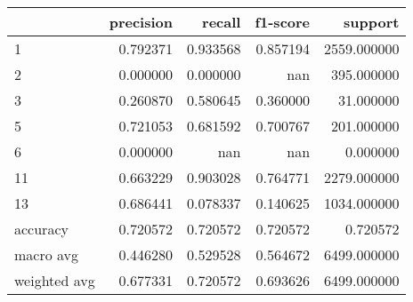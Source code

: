 \begin{tabular}{lrrrr}
\toprule
 & precision & recall & f1-score & support \\
\midrule
1 & 0.792371 & 0.933568 & 0.857194 & 2559.000000 \\
2 & 0.000000 & 0.000000 & nan & 395.000000 \\
3 & 0.260870 & 0.580645 & 0.360000 & 31.000000 \\
5 & 0.721053 & 0.681592 & 0.700767 & 201.000000 \\
6 & 0.000000 & nan & nan & 0.000000 \\
11 & 0.663229 & 0.903028 & 0.764771 & 2279.000000 \\
13 & 0.686441 & 0.078337 & 0.140625 & 1034.000000 \\
accuracy & 0.720572 & 0.720572 & 0.720572 & 0.720572 \\
macro avg & 0.446280 & 0.529528 & 0.564672 & 6499.000000 \\
weighted avg & 0.677331 & 0.720572 & 0.693626 & 6499.000000 \\
\bottomrule
\end{tabular}
